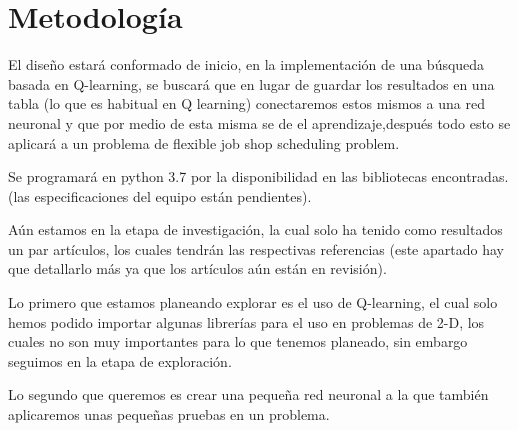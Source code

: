 \documentclass[letterpaper, 10 pt]{article}
\begin{document}

\section{Metodología}
El diseño estará conformado de inicio, en la implementación de una búsqueda basada en Q-learning, se buscará que en lugar de guardar los resultados en una tabla (lo que es habitual en Q learning) conectaremos estos mismos a  una red neuronal y que por medio de esta misma se de el aprendizaje,después todo esto se aplicará a un problema de flexible job shop scheduling problem.

Se programará en python 3.7 por la disponibilidad en las bibliotecas encontradas. (las especificaciones del equipo están pendientes).

Aún estamos en la etapa de investigación, la cual solo ha tenido como resultados un par artículos, los cuales tendrán las respectivas referencias (este apartado hay que detallarlo más ya que los artículos aún están en revisión).

Lo primero que estamos planeando explorar es el uso de Q-learning, el cual solo hemos podido importar algunas librerías para el uso en problemas de 2-D, los cuales no son muy importantes para lo que tenemos planeado, sin embargo seguimos en la etapa de exploración.

Lo segundo que queremos es crear una pequeña red neuronal a la que también aplicaremos unas pequeñas pruebas en un problema.
\end{document}
